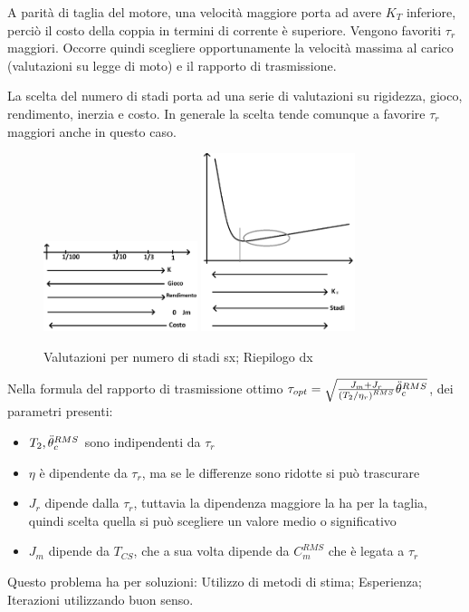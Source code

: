 A parità di taglia del motore, una velocità maggiore porta ad avere \(K_T\) inferiore, perciò il costo della coppia in termini di corrente è superiore. Vengono favoriti \(\tau_r\) maggiori.
Occorre quindi scegliere opportunamente la velocità massima al carico (valutazioni su legge di moto) e il rapporto di trasmissione.

La scelta del numero di stadi porta ad una serie di valutazioni su rigidezza, gioco, rendimento, inerzia e costo.
In generale la scelta tende comunque a favorire \(\tau_r\) maggiori anche in questo caso.

\begin{figure}[h]
    \centering
    \includegraphics[width=0.4\textwidth]{Immagini/numero_std_rid_tau_opt.png}
    \includegraphics[width=0.4\textwidth]{Immagini/riepilogo_tau_opt.png}
    \caption{Valutazioni per numero di stadi sx; Riepilogo dx}
\end{figure}

Nella formula del rapporto di trasmissione ottimo  \(\tau_{opt} = \sqrt{\frac{J_m + J_r}{\left(T_2/\eta_r\right)^{RMS}}\Ddot{\theta}_c^{RMS}}\), dei parametri presenti:
\begin{itemize}
    \item \(T_2, \Ddot{\theta}_c^{RMS}\) sono indipendenti da \(\tau_r\)
    \item \(\eta\) è dipendente da \(\tau_r\), ma se le differenze sono ridotte si può trascurare
    \item \(J_r\) dipende dalla \(\tau_r\), tuttavia la dipendenza maggiore la ha per la taglia, quindi scelta quella si può scegliere un valore medio o significativo
    \item \(J_m\) dipende da \(T_{CS}\), che a sua volta dipende da \(C_m^{RMS}\) che è legata a \(\tau_r\)
\end{itemize}

Questo problema ha per soluzioni: Utilizzo di metodi di stima; Esperienza; Iterazioni utilizzando buon senso.